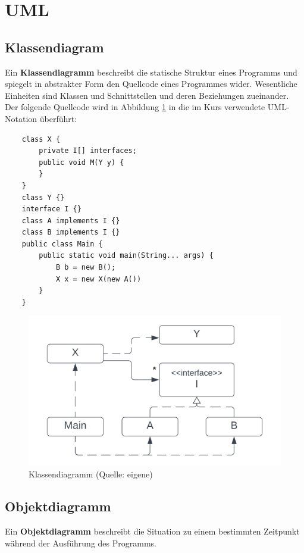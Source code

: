 \section{UML}

\subsection{Klassendiagram}
Ein \textbf{Klassendiagramm} beschreibt die statische Struktur eines Programms und spiegelt in abstrakter Form den Quellcode eines Programmes wider.
Wesentliche Einheiten sind Klassen und Schnittstellen und deren Beziehungen zueinander.
Der folgende Quellcode wird in Abbildung \ref{fig:cc-classdiagram} in die im Kurs verwendete UML-Notation überführt:

\begin{verbatim}
    class X {
        private I[] interfaces;
        public void M(Y y) {
        }
    }
    class Y {}
    interface I {}
    class A implements I {}
    class B implements I {}
    public class Main {
        public static void main(String... args) {
            B b = new B();
            X x = new X(new A())
        }
    }
\end{verbatim}

\begin{figure}
    \centering
    \includegraphics[scale=0.35]{chapters/Anhang/CheatSheet/img/classdiagram}
    \caption{Klassendiagramm (Quelle: eigene)}
    \label{fig:cc-classdiagram}
\end{figure}

\subsection{Objektdiagramm}
Ein \textbf{Objektdiagramm} beschreibt die Situation zu einem bestimmten Zeitpunkt während der Ausführung des Programms.\\

